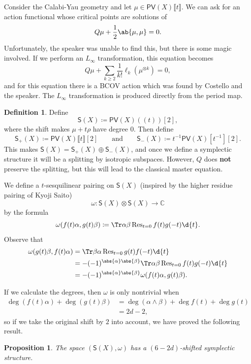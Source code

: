 \documentclass[article,10pt,oneside,oldfontcommands]{memoir}
\newtheorem{prop}[thm]{Proposition}
\theoremstyle{definition}
\newtheorem{defn}[thm]{Definition}
\theoremstyle{remark}
\theoremstyle{plain}
\theoremstyle{definition}
\theoremstyle{remark}
\newcommand{\C}{\mathbb{C}}
\newcommand{\on}[1]{\operatorname{#1}}
\newcommand{\ms}[1]{\mathsf{#1}}
\newcommand{\1}{\mathbf{1}}
\newcommand{\2}{\mathbf{2}}
\newcommand{\3}{\mathbf{3}}
\newcommand{\ps}[1]{\lBrack #1 \rBrack}
\newcommand{\ls}[1]{(\!( #1 )\!)}
\begin{document}
Consider the Calabi-Yau geometry and let \(\mu \in \ms{PV}(X)\ps{t}\). We can ask for an action functional whose critical points are solutions of
\[ Q \mu + \frac{1}{2} \ab\{\mu, \mu\} = 0. \]
Unfortunately, the speaker was unable to find this, but there is some magic involved. If we perform an \(L_{\infty}\) transformation, this equation becomes
\[ Q \mu + \sum_{k \geq 2} \frac{1}{k!} \ell_k (\mu^{\otimes k}) = 0, \]
and for this equation there is a BCOV action which was found by Costello and the speaker. The \(L_{\infty}\) transformation is produced directly from the period map.

\begin{defn}
    Define
    \[ \ms{S}(X) \coloneqq \ms{PV}(X) \ls{t}[2], \]
    where the shift makes \(\mu + t \rho\) have degree \(0\). Then define
    \[ \ms{S}_+(X) \coloneqq \ms{PV}(X) \ps{t}[2] \qquad \text{and} \qquad \ms{S}_-(X) \coloneqq t^{-1} \ms{PV}(X)[{t^{-1}}][2]. \]
    This makes \(\ms{S}(X) = \ms{S}_+(X) \oplus \ms{S}_-(X)\), and once we define a symplectic structure it will be a splitting by isotropic subspaces. However, \(Q\) does \textbf{not} preserve the splitting, but this will lead to the classical master equation.

    We define a \(t\)-sesquilinear pairing on \(\ms{S}(X)\) (inspired by the higher residue pairing of Kyoji Saito)
    \[ \omega \colon \ms{S}(X) \otimes \ms{S}(X) \to \C \]
    by the formula
    \[ \omega(f(t) \alpha, g(t) \beta) \coloneqq \Tr \alpha\beta \on{Res}_{t = 0} f(t) g(-t) \d{t}. \]
    Observe that
    \begin{align*}
        \omega (g(t) \beta, f(t) \alpha) &= \Tr \beta\alpha \on{Res}_{t = 0} g(t) f(-t) \d{t} \\
        &= - (-1)^{\abs{\alpha} \abs{\beta}} \Tr \alpha\beta \on{Res}_{t = 0} f(t) g(-t) \d{t} \\
        &= - (-1)^{\abs{\alpha} \abs{\beta}} \omega(f(t) \alpha, g(t) \beta).
    \end{align*}
\end{defn}

If we calculate the degrees, then \(\omega\) is only nontrivial when 
\begin{align*}
    \deg (f(t) \alpha) + \deg (g(t) \beta) &= \deg (\alpha \wedge \beta) + \deg f(t) + \deg g(t) \\
    &= 2d - 2,
\end{align*}
so if we take the original shift by \(2\) into account, we have proved the following result.

\begin{prop}
    The space \((\ms{S}(X), \omega)\) has a \((6-2d)\)-shifted symplectic structure.
\end{prop}
\end{document}
